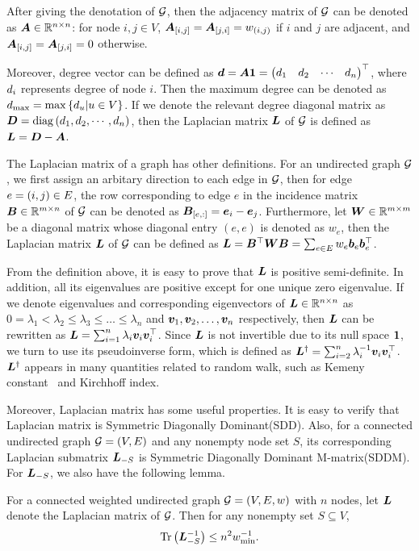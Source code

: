 \documentclass[sigconf]{acmart}
\begin{document}
After giving the denotation of \(\mathcal{G}\), then the adjacency matrix of \(\mathcal{G}\) can be denoted as \(\boldsymbol{A}\in \mathbb{R}^{n\times n}\): for node \(i,j\in V\), \(\boldsymbol{A}_{[i,j]}=\boldsymbol{A}_{[j,i]}=w_{\left( i,j \right)}\) if \(i\) and \(j\) are adjacent, and \(\boldsymbol{A}_{[i,j]}=\boldsymbol{A}_{[j,i]}=0\) otherwise.

Moreover, degree vector can be defined as \(\boldsymbol{d}=\boldsymbol{A}\boldsymbol{1}=\begin{pmatrix}d_1&d_2&\cdots&d_n\end{pmatrix}^\top\), where \(d_i\) represents degree of node \(i\).
Then the maximum degree can be denoted as \(d_{\max}=\max\left\{d_u|u\in V \right\}\).
If we denote the relevant degree diagonal matrix as \(\boldsymbol{D}={\rm{diag}}\left( d_1,d_2,\cdots,d_n \right)\), then the Laplacian matrix \(\boldsymbol{L}\) of \(\mathcal{G}\) is defined as \(\boldsymbol{L}=\boldsymbol{D}-\boldsymbol{A}\).

The Laplacian matrix of a graph has other definitions.
For an undirected graph \(\mathcal{G}\), we first assign an arbitary direction to each edge in \(\mathcal{G}\), then for edge \(e=\left( i,j \right)\in E\), the row corresponding to edge \(e\) in the incidence matrix \(\boldsymbol{B}\in\mathbb{R}^{m\times n}\) of \(\mathcal{G}\) can be denoted as \(\boldsymbol{B}_{[e,:]}=\boldsymbol{e}_i-\boldsymbol{e}_j\).
Furthermore, let \(\boldsymbol{W}\in\mathbb{R}^{m\times m}\) be a diagonal matrix whose diagonal entry \((e,e)\) is denoted as \(w_e\), then the Laplacian matrix \(\boldsymbol{L}\) of \(\mathcal{G}\) can be defined as \(\boldsymbol{L}=\boldsymbol{B}^\top\boldsymbol{W}\boldsymbol{B}=\sum_{e\in E}w_e\boldsymbol{b}_e\boldsymbol{b}_e^\top\).

From the definition above, it is easy to prove that \(\boldsymbol{L}\) is positive semi-definite.
In addition, all its eigenvalues are positive except for one unique zero eigenvalue.
If we denote eigenvalues and corresponding eigenvectors of \(\boldsymbol{L}\in\mathbb{R}^{n\times n}\) as \(0=\lambda_1<\lambda_2\le\lambda_3\le\dots\le\lambda_n\) and \(\boldsymbol{v}_1,\boldsymbol{v}_2,\dots,\boldsymbol{v}_n\) respectively, then \(\boldsymbol{L}\) can be rewritten as \(\boldsymbol{L}=\sum_{i=1}^n\lambda_i\boldsymbol{v}_i\boldsymbol{v}_i^\top\).
Since \(\boldsymbol{L}\) is not invertible due to its null space \(\boldsymbol{1}\), we turn to use its pseudoinverse form, which is defined as \(\boldsymbol{L}^\dagger=\sum_{i=2}^n\lambda_i^{-1}\boldsymbol{v}_i\boldsymbol{v}_i^\top\).
\(\boldsymbol{L}^\dagger\) appears in many quantities related to random walk, such as Kemeny constant~\cite{Hu14} and Kirchhoff index.

Moreover, Laplacian matrix has some useful properties.
It is easy to verify that Laplacian matrix is Symmetric Diagonally Dominant(SDD).
Also, for a connected undirected graph \(\mathcal{G}=(V,E)\) and any nonempty node set \(S\), its corresponding Laplacian submatrix \(\boldsymbol{L}_{-S}\) is Symmetric Diagonally Dominant M-matrix(SDDM).
For \(\boldsymbol{L}_{-S}\), we also have the following lemma.
\begin{lemma}\label{lem:trace-lap}
  For a connected weighted undirected graph \(\mathcal{G}=(V,E,w)\) with \(n\) nodes, let \(\boldsymbol{L}\) denote the Laplacian matrix of \(\mathcal{G}\).
  Then for any nonempty set \(S\subseteq V\),
  \[\mathrm{Tr}\left(\boldsymbol{L}_{-S}^{-1}\right)\le n^2w_{\min}^{-1}.\]
\end{lemma}
\end{document}
